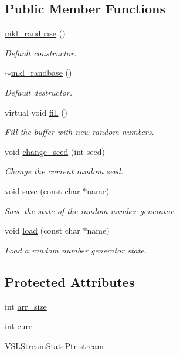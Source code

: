 \subsection*{Public Member Functions}
\begin{DoxyCompactItemize}
\item 
\hyperlink{classmklrand_1_1mkl__randbase_a83f8b1954a948117ae433d93ff986ff0}{mkl\+\_\+randbase} ()
\begin{DoxyCompactList}\small\item\em Default constructor. \end{DoxyCompactList}\item 
\hyperlink{classmklrand_1_1mkl__randbase_a696e5a448c313959a55d21a02193a745}{$\sim$mkl\+\_\+randbase} ()
\begin{DoxyCompactList}\small\item\em Default destructor. \end{DoxyCompactList}\item 
virtual void \hyperlink{classmklrand_1_1mkl__randbase_ac00d006d5c8ad7eadc2e51f1b1604761}{fill} ()
\begin{DoxyCompactList}\small\item\em Fill the buffer with new random numbers. \end{DoxyCompactList}\item 
void \hyperlink{classmklrand_1_1mkl__randbase_a4f41864ffa41b49f69cbac7934edda3e}{change\+\_\+seed} (int seed)
\begin{DoxyCompactList}\small\item\em Change the current random seed. \end{DoxyCompactList}\item 
void \hyperlink{classmklrand_1_1mkl__randbase_a86c4b056e414a635cc12f6530f74f30c}{save} (const char $\ast$name)
\begin{DoxyCompactList}\small\item\em Save the state of the random number generator. \end{DoxyCompactList}\item 
void \hyperlink{classmklrand_1_1mkl__randbase_a37e1bfcc4835e09301d9bac95a446f20}{load} (const char $\ast$name)
\begin{DoxyCompactList}\small\item\em Load a random number generator state. \end{DoxyCompactList}\end{DoxyCompactItemize}
\subsection*{Protected Attributes}
\begin{DoxyCompactItemize}
\item 
int \hyperlink{classmklrand_1_1mkl__randbase_a1e090cd68b19d7d05b4e3f32e5c7a171}{arr\+\_\+size}
\item 
int \hyperlink{classmklrand_1_1mkl__randbase_aeb5c3f18b6d46a6ee53cfeb2a1d95388}{curr}
\item 
V\+S\+L\+Stream\+State\+Ptr \hyperlink{classmklrand_1_1mkl__randbase_a1668b51838583d64b176e159b16bfa7a}{stream}
\end{DoxyCompactItemize}


